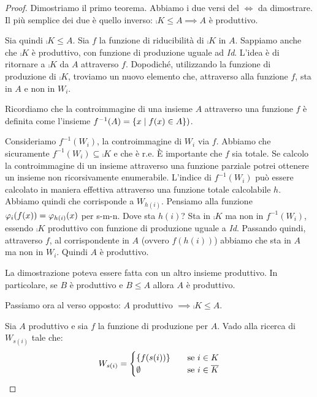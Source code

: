 \begin{proof}
    Dimostriamo il primo teorema. Abbiamo i due versi del $\iff$ da dimostrare. Il più semplice dei due è
    quello inverso: $\comp{K} \leq A \implies A$ è produttivo.

    Sia quindi $\comp{K} \leq A$. Sia $f$ la funzione di riducibilità di $\comp{K}$ in $A$. Sappiamo anche che
    $\comp{K}$ è produttivo, con funzione di produzione uguale ad \textit{Id}. L'idea è di ritornare a
    $\comp{K}$ da $A$ attraverso $f$. Dopodiché, utilizzando la funzione di produzione di
    $\comp{K}$,
    troviamo un nuovo elemento che, attraverso alla funzione $f$, sta in $A$ e non in $W_{i}$.

    Ricordiamo che la controimmagine di una insieme $A$ attraverso una funzione $f$ è definita come
    l'insieme $f^{-1}(A) = \{x \mid f(x) \in A\})$.

    Consideriamo $f^{-1}(W_{i})$, la controimmagine di $W_{i}$ via $f$. Abbiamo che sicuramente
    $f^{-1}(W_{i}) \subseteq \comp{K}$ e che è r.e. È importante che $f$ sia totale. Se calcolo la
    controimmagine di un insieme attraverso una funzione parziale potrei ottenere un insieme non
    ricorsivamente enumerabile. L'indice di $f^{-1}(W_{i})$ può essere calcolato in maniera
    effettiva attraverso una funzione totale calcolabile $h$.  Abbiamo quindi che corrisponde a
    $W_{h(i)}$. Pensiamo alla funzione $\varphi_{i}(f(x)) = \varphi_{h(i)}(x)$ per s-m-n. Dove sta $h(i)$?
    Sta in $\comp{K}$ ma non in $f^{-1}(W_{i})$, essendo $\comp{K}$ produttivo con funzione di
    produzione uguale a \textit{Id}. Passando quindi, attraverso $f$, al corrispondente in $A$
    (ovvero $f(h(i))$) abbiamo che sta in $A$ ma non in $W_{i}$. Quindi $A$ è produttivo.

    La dimostrazione poteva essere fatta con un altro insieme produttivo. In particolare, se $B$ è
    produttivo e $B \leq A$ allora $A$ è produttivo.

    Passiamo ora al verso opposto: $A$ produttivo $\implies \comp{K} \leq A$.

    Sia $A$ produttivo e sia $f$ la funzione di produzione per $A$. Vado alla ricerca di $W_{s(i)}$
    tale che:
    \begin{equation*}
        W_{s(i)} =
        \begin{cases}
            \{f(s(i))\} \quad &\text{se $i \in K$} \\
            \emptyset \quad &\text{se $i \in \overline{K}$}
        \end{cases}
    \end{equation*}


\end{proof}
